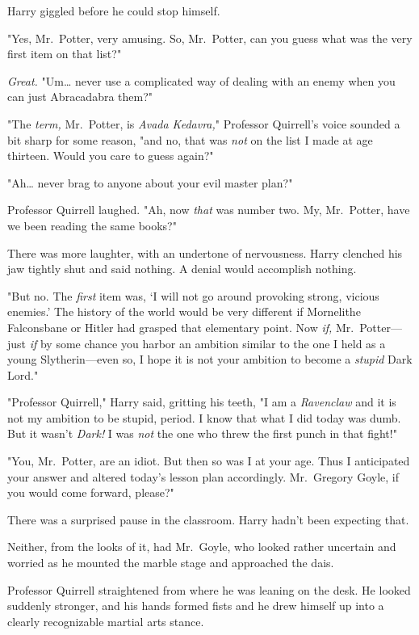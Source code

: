 Harry giggled before he could stop himself.

"Yes, Mr.~Potter, very amusing. So, Mr.~Potter, can you guess what was the very
first item on that list?"

\emph{Great.} "Um{\ldots} never use a complicated way of dealing with an enemy
when you can just Abracadabra them?"

"The \emph{term,} Mr.~Potter, is \emph{Avada Kedavra,}" Professor Quirrell's
voice sounded a bit sharp for some reason, "and no, that was \emph{not} on the
list I made at age thirteen. Would you care to guess again?"

"Ah{\ldots} never brag to anyone about your evil master plan?"

Professor Quirrell laughed. "Ah, now \emph{that} was number two. My,
Mr.~Potter, have we been reading the same books?"

There was more laughter, with an undertone of nervousness. Harry clenched his
jaw tightly shut and said nothing. A denial would accomplish nothing.

"But no. The \emph{first} item was, `I will not go around provoking strong,
vicious enemies.' The history of the world would be very different if
Mornelithe Falconsbane or Hitler had grasped that elementary point. Now
\emph{if,} Mr.~Potter---just \emph{if} by some chance you harbor an ambition
similar to the one I held as a young Slytherin---even so, I hope it is not your
ambition to become a \emph{stupid} Dark Lord."

"Professor Quirrell," Harry said, gritting his teeth, "I am a \emph{Ravenclaw}
and it is not my ambition to be stupid, period. I know that what I did today
was dumb. But it wasn't \emph{Dark!} I was \emph{not} the one who threw the
first punch in that fight!"

"You, Mr.~Potter, are an idiot. But then so was I at your age. Thus I
anticipated your answer and altered today's lesson plan accordingly.
Mr.~Gregory Goyle, if you would come forward, please?"

There was a surprised pause in the classroom. Harry hadn't been expecting that.

Neither, from the looks of it, had Mr.~Goyle, who looked rather uncertain and
worried as he mounted the marble stage and approached the dais.

Professor Quirrell straightened from where he was leaning on the desk. He
looked suddenly stronger, and his hands formed fists and he drew himself up
into a clearly recognizable martial arts stance.

